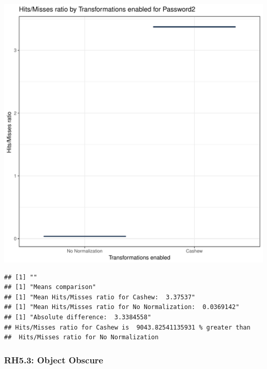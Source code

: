 \documentclass{article}\usepackage[]{graphicx}\usepackage[]{color}
\makeatletter
\def\maxwidth{ %
  \ifdim\Gin@nat@width>\linewidth
    \linewidth
  \else
    \Gin@nat@width
  \fi
}
\newenvironment{kframe}{%
 \def\at@end@of@kframe{}%
 \ifinner\ifhmode%
  \def\at@end@of@kframe{\end{minipage}}%
  \begin{minipage}{\columnwidth}%
 \fi\fi%
 \def\FrameCommand##1{\hskip\@totalleftmargin \hskip-\fboxsep
 \colorbox{shadecolor}{##1}\hskip-\fboxsep
     \hskip-\linewidth \hskip-\@totalleftmargin \hskip\columnwidth}%
 \MakeFramed {\advance\hsize-\width
   \@totalleftmargin\z@ \linewidth\hsize
   \@setminipage}}%
 {\par\unskip\endMakeFramed%
 \at@end@of@kframe}
\newenvironment{knitrout}{}{} %
\makeatother
\begin{document}
\begin{knitrout}
\color{fgcolor}
\includegraphics[width=\maxwidth]{figure/RH5_password2-1} 
\begin{kframe}

{\ttfamily\noindent\bfseries\color{errorcolor}{\#\# Error in eval(expr, envir, enclos): object 'shap\_cashew\_password2' not found}}\begin{verbatim}
## [1] ""
## [1] "Means comparison"
## [1] "Mean Hits/Misses ratio for Cashew:  3.37537"
## [1] "Mean Hits/Misses ratio for No Normalization:  0.0369142"
## [1] "Absolute difference:  3.3384558"
## Hits/Misses ratio for Cashew is  9043.82541135931 % greater than 
##  Hits/Misses ratio for No Normalization
\end{verbatim}
\end{kframe}
\end{knitrout}


\subsubsection{RH5.3: Object Obscure}
\end{document}

